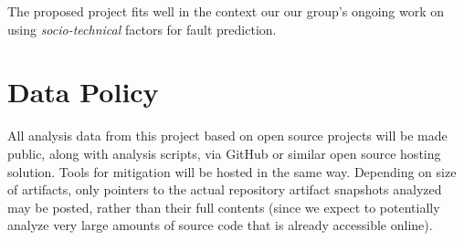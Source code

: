 \documentclass[10pt]{article}
\begin{document}
  The proposed project fits well in the context our our group's ongoing work on using \emph{socio-technical} factors for fault prediction.

\section{Data Policy}

All analysis data from this project based on open source projects will be made public, along with analysis scripts, via GitHub or similar open source hosting solution.  Tools for mitigation will be hosted in the same way.  Depending on size of artifacts, only pointers to the actual repository artifact snapshots analyzed may be posted, rather than their full contents (since we expect to potentially analyze very large amounts of source code that is already accessible online).



\end{document}

